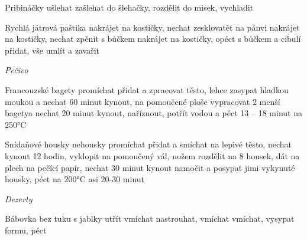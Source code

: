 \documentclass[12pt,a4paper]{article}
\begin{document}
\begin{recipe}{Pribináčky}
   ušlehat
   zašlehat do šlehačky, rozdělit do misek, vychladit
\end{recipe}
\newpage

\begin{recipe}{Rychlá játrová paštika}
   nakrájet na kostičky, nechat zesklovatět na pánvi
   nakrájet na kostičky, nechat zpěnit s bůčkem
   nakrájet na kostičky, opéct s bůčkem a cibulí
   přidat, vše umlít a zavařit
\end{recipe}
\newpage

\vspace*{\fill}
\hfill {\Huge\it Pečivo}\hfill
\vspace*{\fill}
\newpage

\begin{recipe}{Francouzské bagety}
   promíchat
   přidat a zpracovat těsto, lehce zasypat hladkou moukou a nechat 60 minut kynout, na pomoučené ploše vypracovat 2 menší bagetya nechat 20 minut kynout,
    naříznout, potřít vodou a péct 13 -- 18 minut na 250°C
\end{recipe}
\newpage

\begin{recipe}{Snídaňové housky nehousky}
   promíchat
   přidat a smíchat na lepivé těsto, nechat kynout 12 hodin, vyklopit na pomoučený vál, nožem rozdělit na 8 housek, dát na plech na pečící papír, nechat 30 minut kynout
   namočit a posypat jimi vykynuté housky, péct na 200°C asi 20-30 minut
\end{recipe}
\newpage

\vspace*{\fill}
\hfill {\Huge\it Dezerty}\hfill
\vspace*{\fill}
\newpage

\begin{recipe}{Bábovka bez tuku s jablky}
   utřít
   vmíchat
   nastrouhat, vmíchat
   vmíchat, vysypat formu, péct
\end{recipe}
\newpage
\end{document}
